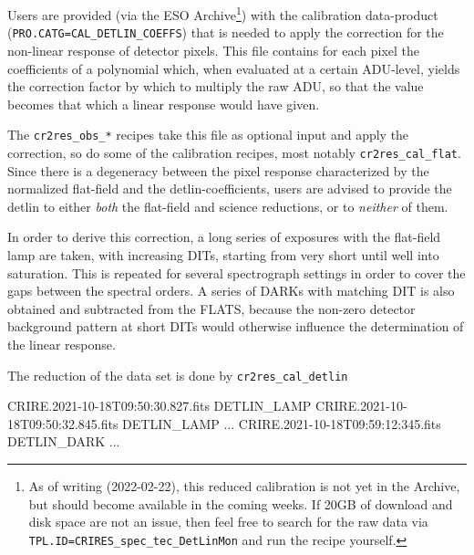 

Users are provided (via the ESO Archive\footnote{As of writing (2022-02-22),
this reduced calibration is not yet in the Archive, but should become available
in the coming weeks. If 20GB of download and disk space are not an issue, then
feel free to search for the raw data via
\texttt{TPL.ID=CRIRES\_spec\_tec\_DetLinMon} and run the recipe yourself.}) with the
calibration data-product (\verb!PRO.CATG=CAL_DETLIN_COEFFS!) that is needed to
apply the correction for the non-linear response of detector pixels. This file
contains for each pixel the coefficients of a polynomial which, when evaluated
at a certain ADU-level, yields the correction factor by which to multiply the
raw ADU, so that the value becomes that which a linear response would have
given.

The \verb!cr2res_obs_*! recipes take
this file as optional input and apply the correction, so do some of the
calibration recipes, most notably \verb!cr2res_cal_flat!. Since there is a
degeneracy between the pixel response characterized by the normalized flat-field
and the detlin-coefficients, users are advised to provide the detlin to either
\emph{both} the flat-field and science reductions, or to \emph{neither} of them.


In order to derive this correction, a long series of exposures with the
flat-field lamp are taken, with increasing DITs, starting from very short until
well into saturation. This is repeated for several spectrograph settings in
order to cover the gaps between the spectral orders. A series of DARKs with
matching DIT is also obtained and subtracted from the FLATS, because the
non-zero detector background pattern at short DITs would otherwise influence the
determination of the linear response.

The reduction of the data set is done by \verb!cr2res_cal_detlin!
\begin{shell}[fontsize=\footnotesize]
    CRIRE.2021-10-18T09:50:30.827.fits DETLIN_LAMP
    CRIRE.2021-10-18T09:50:32.845.fits DETLIN_LAMP
    ...
    CRIRE.2021-10-18T09:59:12:345.fits DETLIN_DARK
    ...

\end{shell}

